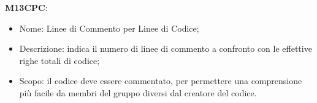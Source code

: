     \textbf{M13CPC}:
    \begin{itemize}
      \item Nome: Linee di Commento per Linee di Codice;
      \item Descrizione: indica il numero di linee di commento a confronto con le effettive righe totali di codice;
      \item Scopo: il codice deve essere commentato, per permettere una comprensione più facile da membri del gruppo diversi dal creatore del codice.
    \end{itemize}

			